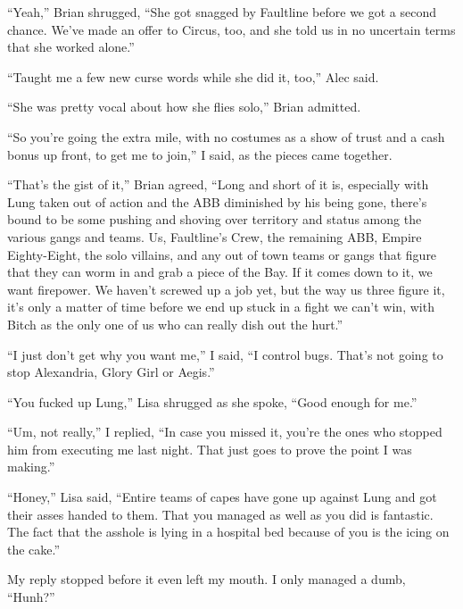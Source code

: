 ``Yeah,'' Brian shrugged, ``She got snagged by Faultline before we got a second chance.  We've made an offer to Circus, too, and she told us in no uncertain terms that she worked alone.''



``Taught me a few new curse words while she did it, too,'' Alec said.



``She was pretty vocal about how she flies solo,'' Brian admitted.



``So you're going the extra mile, with no costumes as a show of trust and a cash bonus up front, to get me to join,'' I said, as the pieces came together.



``That's the gist of it,'' Brian agreed, ``Long and short of it is, especially with Lung taken out of action and the ABB diminished by his being gone, there's bound to be some pushing and shoving over territory and status among the various gangs and teams.  Us, Faultline's Crew, the remaining ABB, Empire Eighty-Eight, the solo villains, and any out of town teams or gangs that figure that they can worm in and grab a piece of the Bay.  If it comes down to it, we want firepower.  We haven't screwed up a job yet, but the way us three figure it, it's only a matter of time before we end up stuck in a fight we can't win, with Bitch as the only one of us who can really dish out the hurt.''



``I just don't get why you want me,'' I said, ``I control bugs.  That's not going to stop Alexandria, Glory Girl or Aegis.''



``You fucked up Lung,'' Lisa shrugged as she spoke, ``Good enough for me.''



``Um, not really,'' I replied, ``In case you missed it, you're the ones who stopped him from executing me last night.  That just goes to prove the point I was making.''



``Honey,'' Lisa said, ``Entire teams of capes have gone up against Lung and got their asses handed to them.  That you managed as well as you did is fantastic.  The fact that the asshole is lying in a hospital bed because of you is the icing on the cake.''



My reply stopped before it even left my mouth.  I only managed a dumb, ``Hunh?''



